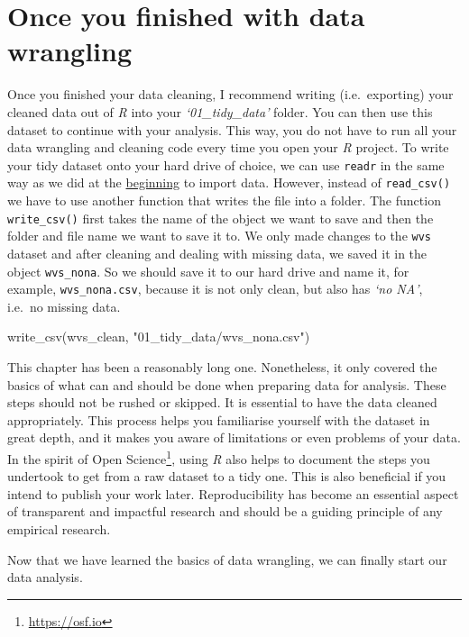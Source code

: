 \documentclass[
  letterpaper,
]{krantz}
\makeatletter
\newenvironment{Shaded}{\begin{snugshade}}{\end{snugshade}}
\newcommand{\FunctionTok}[1]{\textcolor[rgb]{0.28,0.35,0.67}{#1}}
\newcommand{\NormalTok}[1]{\textcolor[rgb]{0.00,0.23,0.31}{#1}}
\newcommand{\StringTok}[1]{\textcolor[rgb]{0.13,0.47,0.30}{#1}}
\renewcommand{\href}[2]{#2\footnote{\url{#1}}}
\newenvironment{kframe}{%
\medskip{}
\setlength{\fboxsep}{.8em}
 \def\at@end@of@kframe{}%
 \ifinner\ifhmode%
  \def\at@end@of@kframe{\end{minipage}}%
  \begin{minipage}{\columnwidth}%
 \fi\fi%
 \def\FrameCommand##1{\hskip\@totalleftmargin \hskip-\fboxsep
 \colorbox{shadecolor}{##1}\hskip-\fboxsep
     \hskip-\linewidth \hskip-\@totalleftmargin \hskip\columnwidth}%
 \MakeFramed {\advance\hsize-\width
   \@totalleftmargin\z@ \linewidth\hsize
   \@setminipage}}%
 {\par\unskip\endMakeFramed%
 \at@end@of@kframe}
\renewenvironment{Shaded}{\begin{kframe}}{\end{kframe}}
\makeatother
\begin{document}
\section{Once you finished with data
wrangling}\label{conclusion-data-wrangling}

Once you finished your data cleaning, I recommend writing
(i.e.~exporting) your cleaned data out of \emph{R} into your
\emph{`01\_tidy\_data'} folder. You can then use this dataset to
continue with your analysis. This way, you do not have to run all your
data wrangling and cleaning code every time you open your \emph{R}
project. To write your tidy dataset onto your hard drive of choice, we
can use \texttt{readr} in the same way as we did at the
\hyperref[importing-data-using-functions]{beginning} to import data.
However, instead of \texttt{read\_csv()} we have to use another function
that writes the file into a folder. The function \texttt{write\_csv()}
first takes the name of the object we want to save and then the folder
and file name we want to save it to. We only made changes to the
\texttt{wvs} dataset and after cleaning and dealing with missing data,
we saved it in the object \texttt{wvs\_nona}. So we should save it to
our hard drive and name it, for example, \texttt{wvs\_nona.csv}, because
it is not only clean, but also has \emph{`no NA'}, i.e.~no missing data.

\begin{Shaded}
\begin{Highlighting}[]
\FunctionTok{write\_csv}\NormalTok{(wvs\_clean, }\StringTok{"01\_tidy\_data/wvs\_nona.csv"}\NormalTok{)}
\end{Highlighting}
\end{Shaded}

This chapter has been a reasonably long one. Nonetheless, it only
covered the basics of what can and should be done when preparing data
for analysis. These steps should not be rushed or skipped. It is
essential to have the data cleaned appropriately. This process helps you
familiarise yourself with the dataset in great depth, and it makes you
aware of limitations or even problems of your data. In the spirit of
\href{https://osf.io}{Open Science}, using \emph{R} also helps to
document the steps you undertook to get from a raw dataset to a tidy
one. This is also beneficial if you intend to publish your work later.
Reproducibility has become an essential aspect of transparent and
impactful research and should be a guiding principle of any empirical
research.

Now that we have learned the basics of data wrangling, we can finally
start our data analysis.
\end{document}
